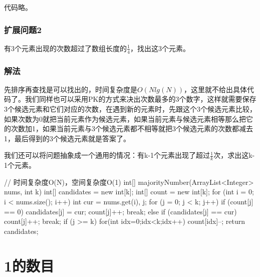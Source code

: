 代码略。
\subsubsection{扩展问题2}
有3个元素出现的次数超过了数组长度的$\frac{1}{4}$，找出这3个元素。

\subsubsection{解法}
先排序再查找是可以找出的，时间复杂度是$O(Nlg(N))$，这里就不给出具体代码了。我们同样也可以采用PK的方式来决出次数最多的3个数字，这样就需要保存3个候选元素和它们对应的次数，在遇到新的元素时，先跟这个3个候选元素比较，
如果次数为0就把当前元素作为候选元素，如果当前元素与候选元素相等那么把它的次数加1，如果当前元素与3个候选元素都不相等就把3个候选元素的次数都减去1，最后得到的3个候选元素就是答案了。

我们还可以将问题抽象成一个通用的情况：有k-1个元素出现了超过$\frac{1}{k}$次，求出这k-1个元素。
\begin{Code}
// 时间复杂度O(N)，空间复杂度O(1)
int[] majorityNumber(ArrayList<Integer> nums, int k) {
    int[] candidates = new int[k];
    int[] count = new int[k];
    for (int i = 0; i < nums.size(); i++) {
        int cur = nums.get(i), j;
        for (j = 0; j < k; j++) {
            if (count[j] == 0) {
                candidates[j] = cur;
                count[j]++;
                break;
            } else if (candidates[j] == cur) {
                count[j]++;
                break;
            }
        }
        if (j >= k) {
            for(int idx=0;idx<k;idx++) {
                count[idx]--;
            }
        }
    }
    return candidates;
}
\end{Code}


\section{1的数目} %
\label{sec:number-of-ones-in-sequence}

